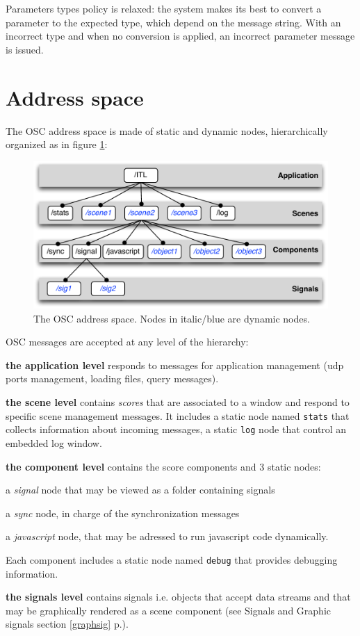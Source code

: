 \documentclass[a4paper,twoside]{report}
\newcommand{\sublevel}[1]	{\section{#1}}
\newcommand{\fullref}[1]	{\ref{#1} p.\pageref{#1}}
\newcommand{\OSC}[1]		{\texttt{#1}}
\let\olditemize\itemize
\let\oldenditemize\enditemize
\renewenvironment{itemize} 	{\olditemize \setlength{\itemsep}{1mm}}{\oldenditemize}
\begin{document}
Parameters types policy is relaxed: the system makes its best to convert a parameter to the expected type, which depend on the message string. With an incorrect type and when no conversion is applied, an incorrect parameter message is issued.

\sublevel{Address space}
The OSC address space is made of static and dynamic nodes, hierarchically organized as in figure \ref{fig:addrspace}:

\begin{figure}[h]
	\centering \includegraphics[width=120mm]{imgs/address_space}
 \caption{The OSC address space. Nodes in italic/blue are dynamic nodes.}
 \label{fig:addrspace}
\end{figure}

OSC messages are accepted at any level of the hierarchy:
\begin{itemize}

\item \textbf{the application level} responds to messages for application management (udp ports management, loading files, query messages). \\

\item \textbf{the scene level} contains \emph{scores} that are associated to a window and respond to specific scene management messages. 
It includes a static node named \OSC{stats} that collects information about incoming messages, a static \OSC{log} node that control an embedded log window.


\item \textbf{the component level} contains the score components and 3 static nodes:
\begin{itemize}
\item a \emph{signal} node that may be viewed as a folder containing signals
\item a \emph{sync} node, in charge of the synchronization messages
\item a \emph{javascript} node, that may be adressed to run javascript code dynamically.
\end{itemize}

Each component includes a static node named \OSC{debug} that provides debugging information.
\item \textbf{the signals level} contains signals i.e. objects that accept data streams and that may be graphically rendered as a scene component (see Signals and Graphic signals section \fullref{graphsig}).

\end{itemize}
\end{document}

